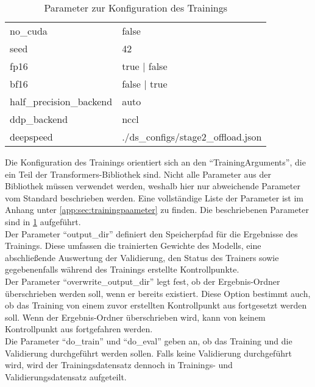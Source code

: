 \begin{table}
\begin{tabular}{ll}
        no\_cuda & false \\
        seed & 42 \\
        fp16 & true | false \\
        bf16 & false | true \\
        half\_precision\_backend & auto \\
        ddp\_backend & nccl \\
        deepspeed & ./ds\_configs/stage2\_offload.json \\
        \bottomrule
    \end{tabular}
    \caption{Parameter zur Konfiguration des Trainings}\label{tab:training-config}
\end{table}

Die Konfiguration des Trainings orientiert sich an den \enquote{TrainingArguments}, die ein Teil der Transformers-Bibliothek sind.
Nicht alle Parameter aus der Bibliothek müssen verwendet werden, weshalb hier nur abweichende Parameter vom Standard beschrieben werden.
Eine vollständige Liste der Parameter ist im Anhang unter \cref{app:sec:trainingpaameter} zu finden. Die beschriebenen Parameter sind in \cref{tab:training-config} aufgeführt.\\

Der Parameter \enquote{output\_dir} definiert den Speicherpfad für die Ergebnisse des Trainings.
Diese umfassen die trainierten Gewichte des Modells, eine abschließende Auswertung der Validierung, den Status des Trainers sowie gegebenenfalls während des Trainings erstellte Kontrollpunkte.\\

Der Parameter \enquote{overwrite\_output\_dir} legt fest, ob der Ergebnis-Ordner überschrieben werden soll, wenn er bereits existiert.
Diese Option bestimmt auch, ob das Training von einem zuvor erstellten Kontrollpunkt aus fortgesetzt werden soll.
Wenn der Ergebnis-Ordner überschrieben wird, kann von keinem Kontrollpunkt aus fortgefahren werden.\\

Die Parameter \enquote{do\_train} und \enquote{do\_eval} geben an, ob das Training und die Validierung durchgeführt werden sollen.
Falls keine Validierung durchgeführt wird, wird der Trainingsdatensatz dennoch in Trainings- und Validierungsdatensatz aufgeteilt.\\

